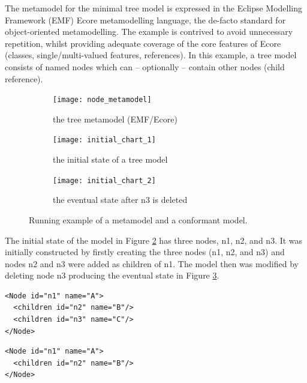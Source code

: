 The metamodel for the minimal tree model is expressed in the Eclipse Modelling Framework (EMF) Ecore metamodelling language, the de-facto standard for object-oriented metamodelling.  The example is contrived to avoid unnecessary repetition, whilst providing adequate coverage of the core features of Ecore (classes, single/multi-valued features, references).
In this example, a tree model consists of named nodes which can -- optionally -- contain other nodes (\textsf{child} reference). 

\begin{figure}[ht]
\begin{subfigure}[t]{0.32\linewidth}
\centering
\texttt{[image: node\_metamodel]}
\caption{the tree metamodel (EMF/Ecore)}
\label{fig:tree_metamodel}
\end{subfigure}
\hfill
\begin{subfigure}[t]{0.32\linewidth}
\centering
\texttt{[image: initial\_chart\_1]}
\caption{the initial state of a tree model}
\label{fig:initial_model}
\end{subfigure}
\hfill
\begin{subfigure}[t]{0.32\linewidth}
  \centering
  \texttt{[image: initial\_chart\_2]}
  \caption{the eventual state after \textsf{n3} is deleted}
  \label{fig:modified_model}
\end{subfigure}
\caption{Running example of a metamodel and a conformant model.}
\label{fig:tree_example}
\end{figure}

The initial state of the model in Figure \ref{fig:initial_model} has three nodes, \textsf{n1}, \textsf{n2}, and \textsf{n3}. It was initially constructed by firstly creating the three nodes (\textsf{n1}, \textsf{n2}, and \textsf{n3}) and nodes \textsf{n2} and \textsf{n3} were added as children of \textsf{n1}. The model then was modified by deleting node \textsf{n3} producing the eventual state in Figure \ref{fig:modified_model}.

\vspace{-20pt}
\begin{minipage}[t]{0.49\linewidth}
\begin{lstlisting}[style=xmi,caption={State-based representation in simplified XMI of the tree model in Figure \ref{fig:initial_model}.},label=lst:xmimodel_0]
<Node id="n1" name="A">
  <children id="n2" name="B"/>
  <children id="n3" name="C"/>
</Node>
\end{lstlisting}
\end{minipage}
\hfill
\begin{minipage}[t]{0.49\linewidth}
\begin{lstlisting}[style=xmi,caption={State-based representation in simplified XMI of the tree model in Figure \ref{fig:modified_model}.},label=lst:xmimodel]
<Node id="n1" name="A">
  <children id="n2" name="B"/>
</Node>
\end{lstlisting}
\end{minipage}

